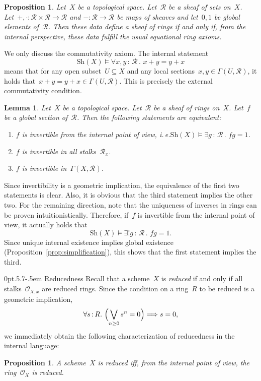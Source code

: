 \documentclass[10pt,reqno,a4paper]{amsbook}
\makeatletter
\theoremstyle{definition}
\theoremstyle{plain}
\newtheorem{prop}[defn]{Proposition}
\newtheorem{lemma}[defn]{Lemma}
\theoremstyle{remark}
\renewcommand{\O}{\mathcal{O}}
\newcommand{\R}{\mathcal{R}}
\newcommand{\Sh}{\mathrm{Sh}}
\newcommand{\?}{\,{:}\,}
\renewcommand{\_}{\mathpunct{.}\,}
\newcommand{\ie}{i.\,e.\@\xspace}
\renewenvironment{proof}[1][\proofname]{\par
  \pushQED{\qed}%
  \normalfont \topsep6\p@\@plus6\p@\relax
  \trivlist
  \item[\hskip\labelsep
        \itshape
    #1\@addpunct{.}]\ignorespaces
}{%
  \popQED\endtrivlist\@endpefalse
}
\def\subsection{\@startsection{subsection}{2}%
  {0pt}{.5\linespacing\@plus.7\linespacing}{-.5em}%
  {\normalfont\bfseries}}
\makeatother
\begin{document}
\begin{prop}\label{prop:rings-internally}
Let~$X$ be a topological space. Let~$\R$ be a sheaf of sets on~$X$.
Let~$+, \cdot : \R \times \R \to \R$ and $- : \R \to \R$ be maps of sheaves and let~$0, 1$ be
global elements of~$\R$. Then these data define a sheaf of rings if and only
if, from the internal perspective, these data fulfill the usual equational ring
axioms.\end{prop}
\begin{proof}We only discuss the commutativity axiom. The internal statement
\[ \Sh(X) \models \forall x,y\?\R\_ x + y = y + x \]
means that for any open subset~$U \subseteq X$ and any local sections~$x,y \in
\Gamma(U,\R)$, it holds that~$x + y = y + x \in \Gamma(U,\R)$. This is
precisely the external commutativity condition.
\end{proof}

\begin{lemma}\label{lemma:internal-invertibility}
Let~$X$ be a topological space. Let~$\R$ be a sheaf of rings
on~$X$. Let~$f$ be a global section of~$\R$. Then the following statements are
equivalent:
\begin{enumerate}
\item $f$ is invertible from the internal point of view, \ie $\Sh(X) \models
\exists g\?\R\_ fg = 1$.
\item $f$ is invertible in all stalks~$\R_x$.
\item $f$ is invertible in~$\Gamma(X,\R)$.
\end{enumerate}
\end{lemma}
\begin{proof}Since invertibility is a geometric implication, the equivalence of
the first two statements is clear. Also, it is obvious that the third statement
implies the other two. For the remaining direction, note that the
uniqueness of inverses in rings can be proven intuitionistically. Therefore, if~$f$ is invertible
from the internal point of view, it actually holds that
\[ \Sh(X) \models \exists! g\?\R\_ fg = 1. \]
Since unique internal existence implies global existence
(Proposition~\ref{prop:simplification}), this shows that the first statement
implies the third.
\end{proof}


\subsection{Reducedness}\label{sect:reducedness} Recall that a scheme~$X$ is \emph{reduced} if and only
if all stalks~$\O_{X,x}$ are reduced rings. Since the condition on a ring~$R$
to be reduced is a geometric implication,
\[ \forall s\?R\_ \Bigl(\bigvee_{n \geq 0} s^n = 0\Bigr) \Longrightarrow s = 0, \]
we immediately obtain the following characterization of reducedness in the
internal language:
\begin{prop}\label{prop:reduced-ring}
A scheme~$X$ is reduced iff, from the internal point of view, the
ring~$\O_X$ is reduced.\end{prop}
\end{document}

